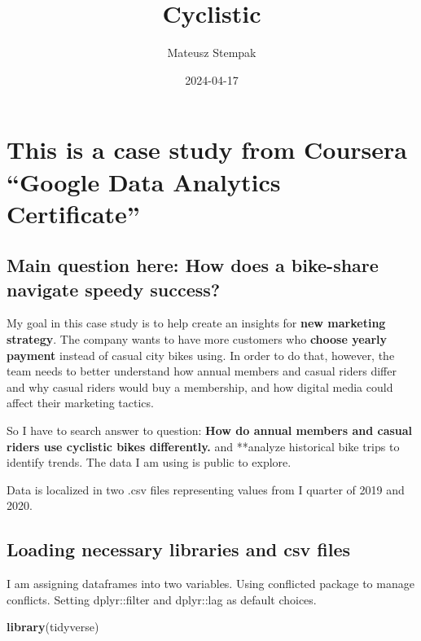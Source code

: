 \documentclass[
]{article}
\title{Cyclistic}
\author{Mateusz Stempak}
\date{2024-04-17}
\newenvironment{Shaded}{\begin{snugshade}}{\end{snugshade}}
\newcommand{\FunctionTok}[1]{\textcolor[rgb]{0.13,0.29,0.53}{\textbf{#1}}}
\newcommand{\NormalTok}[1]{#1}
\begin{document}
\maketitle

\hypertarget{this-is-a-case-study-from-coursera-google-data-analytics-certificate}{%
\section{This is a case study from Coursera ``Google Data Analytics
Certificate''}\label{this-is-a-case-study-from-coursera-google-data-analytics-certificate}}

\hypertarget{main-question-here-how-does-a-bike-share-navigate-speedy-success}{%
\subsection{Main question here: How does a bike-share navigate speedy
success?}\label{main-question-here-how-does-a-bike-share-navigate-speedy-success}}

My goal in this case study is to help create an insights for \textbf{new
marketing strategy}. The company wants to have more customers who
\textbf{choose yearly payment} instead of casual city bikes using. In
order to do that, however, the team needs to better understand how
annual members and casual riders differ and why casual riders would buy
a membership, and how digital media could affect their marketing
tactics.

So I have to search answer to question: \textbf{How do annual members
and casual riders use cyclistic bikes differently.} and **analyze
historical bike trips to identify trends. The data I am using is public
to explore.

Data is localized in two .csv files representing values from I quarter
of 2019 and 2020.

\hypertarget{loading-necessary-libraries-and-csv-files}{%
\subsection{Loading necessary libraries and csv
files}\label{loading-necessary-libraries-and-csv-files}}

I am assigning dataframes into two variables. Using conflicted package
to manage conflicts. Setting dplyr::filter and dplyr::lag as default
choices.

\begin{Shaded}
\begin{Highlighting}[]
\FunctionTok{library}\NormalTok{(tidyverse)}
\end{Highlighting}
\end{Shaded}
\end{document}
